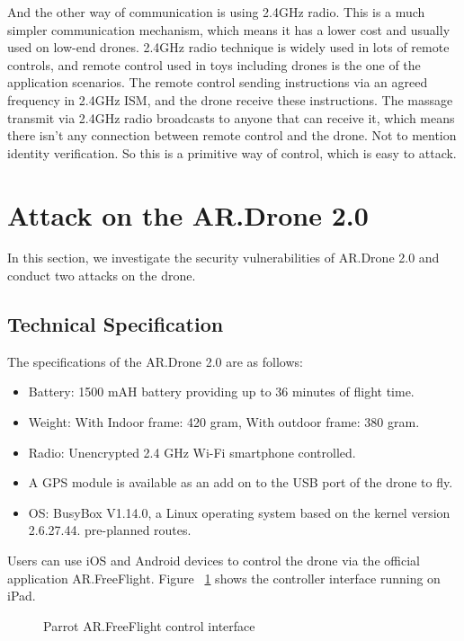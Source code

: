 \documentclass{acm_proc_article-sp}
\begin{document}
 
 And the other way of communication is using 2.4GHz radio. This is a much simpler communication mechanism, which means it has a lower cost and usually used on low-end drones. 2.4GHz radio technique is widely used in lots of remote controls, and remote control used in toys including drones is the one of the application scenarios. The remote control sending instructions via an agreed frequency in 2.4GHz ISM, and the drone receive these instructions. The massage transmit via 2.4GHz radio broadcasts to anyone that can receive it, which means there isn't any connection between remote control and the drone. Not to mention identity verification. So this is a primitive way of control, which is easy to attack.

\section{Attack on the AR.Drone 2.0}

In this section, we investigate the security vulnerabilities of AR.Drone 2.0 and conduct two attacks on the drone.

\subsection{Technical Specification}
The specifications of the AR.Drone 2.0 are as follows:

\begin{itemize}
  \item Battery: 1500 mAH battery providing up to 36 minutes of flight time.
  \item Weight: With Indoor frame: 420 gram, With outdoor frame: 380 gram.
  \item Radio: Unencrypted 2.4 GHz Wi-Fi smartphone controlled.
  \item A GPS module is available as an add on to the USB port of the drone to fly.
  \item OS: BusyBox V1.14.0,  a Linux operating system based on the kernel version 2.6.27.44.
pre-planned routes.
\end{itemize}

Users can use iOS and Android devices to control the drone via the official application AR.FreeFlight. Figure ~\ref{iPad} shows the controller interface running on iPad. 

\begin{figure}
\centering
{}
\caption{Parrot AR.FreeFlight control interface}
\label{iPad}
\end{figure}
\end{document}

